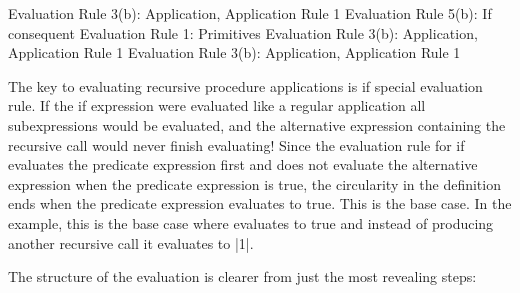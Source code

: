 \begin{schemeregion}
 {Evaluation Rule 3(b): Application, Application Rule 1}
 {Evaluation Rule 5(b): If consequent}
 {Evaluation Rule 1: Primitives}
 {Evaluation Rule 3(b): Application, Application Rule 1} 
\evalunindent
{} {Evaluation Rule 3(b): Application, Application Rule 1}
\evalunindent
{}
\evalend

The key to evaluating recursive procedure applications is if special evaluation rule.  If the if expression were evaluated like a regular application all subexpressions would be evaluated, and the alternative expression containing the recursive call would never finish evaluating!  Since the evaluation rule for if evaluates the predicate expression first and does not evaluate the alternative expression when the predicate expression is true, the circularity in the definition ends when the predicate expression evaluates to true.  This is the base case.  In the example, this is the base case where  evaluates to true and instead of producing another recursive call it evaluates to \schemeresult|1|.

 The structure of the evaluation is clearer from just the most revealing steps:


\end{schemeregion}
